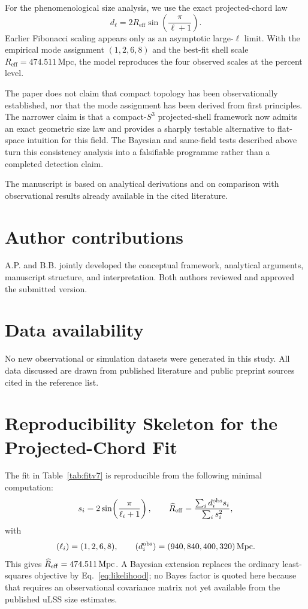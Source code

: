 \documentclass[
  aps,
  prd,
  reprint,
  superscriptaddress,
  nofootinbib,
  longbibliography,
  floatfix,
  amsmath,
  amssymb
]{revtex4-2}
\theoremstyle{plain}
\theoremstyle{definition}
\theoremstyle{remark}
\newcommand{\Reff}{R_{\mathrm{eff}}}
\begin{document}
For the phenomenological size analysis, we use the exact
projected-chord law
\begin{equation}
  d_\ell = 2\Reff \sin\!\left(\frac{\pi}{\ell+1}\right).
\end{equation}
Earlier Fibonacci scaling appears only as an asymptotic large-$\ell$
limit. With the empirical mode assignment $(1,2,6,8)$ and the best-fit
shell scale $\Reff=474.511\,\mathrm{Mpc}$, the model reproduces the
four observed scales at the percent level.

The paper does not claim that compact topology has been observationally
established, nor that the mode assignment has been derived from first
principles. The narrower claim is that a compact-$S^3$ projected-shell
framework now admits an exact geometric size law and provides a sharply
testable alternative to flat-space intuition for this field. The Bayesian
and same-field tests described above turn this consistency analysis into
a falsifiable programme rather than a completed detection claim.

\begin{acknowledgments}
The manuscript is based on analytical derivations and on comparison
with observational results already available in the cited literature.
\end{acknowledgments}

\section*{Author contributions}
A.P. and B.B. jointly developed the conceptual framework, analytical
arguments, manuscript structure, and interpretation. Both authors
reviewed and approved the submitted version.

\section*{Data availability}
No new observational or simulation datasets were generated in this
study. All data discussed are drawn from published literature and public
preprint sources cited in the reference list.


\appendix
\section{Reproducibility Skeleton for the Projected-Chord Fit}
\label{app:fit-skeleton}

The fit in Table~\ref{tab:fitv7} is reproducible from the following
minimal computation:
\begin{equation}
  s_i=2\sin\!\left(\frac{\pi}{\ell_i+1}\right),\qquad
  \widehat R_{\rm eff}=\frac{\sum_i d_i^{\rm obs}s_i}{\sum_i s_i^2},
\end{equation}
with
\begin{equation}
  (\ell_i)=(1,2,6,8),\qquad
  (d_i^{\rm obs})=(940,840,400,320)\,\mathrm{Mpc}.
\end{equation}
This gives $\widehat R_{\rm eff}=474.511\,\mathrm{Mpc}$. A Bayesian
extension replaces the ordinary least-squares objective by
Eq.~\eqref{eq:likelihood}; no Bayes factor is quoted here because
that requires an observational covariance matrix not yet available from
the published uLSS size estimates.
\end{document}
